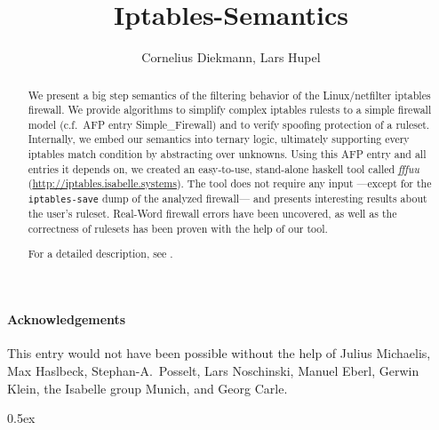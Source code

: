 \documentclass[11pt,a4paper]{article}
\begin{document}
\title{Iptables-Semantics}
\author{Cornelius Diekmann, Lars Hupel}
\maketitle

\begin{abstract}  
  We present a big step semantics of the filtering behavior of the Linux/netfilter iptables firewall. 
  We provide algorithms to simplify complex iptables rulests to a simple firewall model (c.f.\ AFP entry Simple\_Firewall) and to verify spoofing protection of a ruleset. 
  Internally, we embed our semantics into ternary logic, ultimately supporting every iptables match condition by abstracting over unknowns. 
  Using this AFP entry and all entries it depends on, we created an easy-to-use, stand-alone haskell tool called \emph{fffuu} (\url{http://iptables.isabelle.systems}). 
  The tool does not require any input ---except for the \texttt{iptables-save} dump of the analyzed firewall--- and presents interesting results about the user's ruleset. 
  Real-Word firewall errors have been uncovered, as well as the correctness of rulesets has been proven with the help of our tool. 
  
For a detailed description, see \cite{diekmann2015fm,diekmann2015cnsm,diekmann2016networking,diekmann2015congress}. 
\end{abstract}

\paragraph*{Acknowledgements}
This entry would not have been possible without the help of Julius Michaelis, Max Haslbeck, Stephan-A.\ Posselt, Lars Noschinski, Manuel Eberl, Gerwin Klein, the Isabelle group Munich, and Georg Carle.
\bigskip

\tableofcontents

\parindent 0pt\parskip 0.5ex





\end{document}
